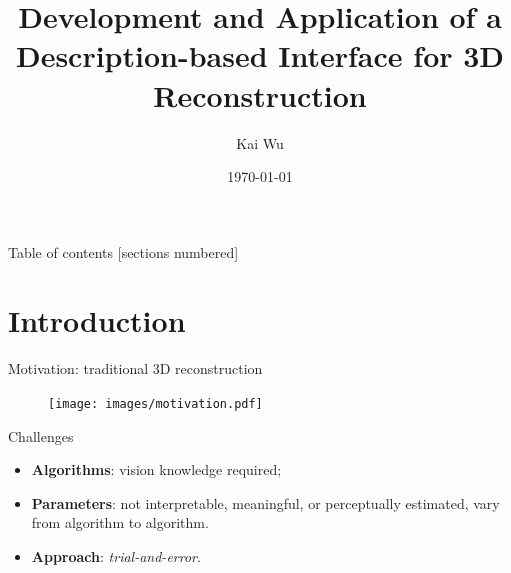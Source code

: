 \documentclass[10pt]{beamer}
\title[Interface of 3D Reconstruction]{Development and Application of a Description-based Interface for 3D Reconstruction} %
\author{Kai Wu}
\institute[UBC]
{
University of British Columbia \\ %
\medskip
kaywu@ece.ubc.ca \\ %
}
\date{\today}
\begin{document}
\begin{frame}
\maketitle
\end{frame}

\begin{frame}{Table of contents}
  [sections numbered]
  \tableofcontents[hideallsubsections]
\end{frame}


\section{Introduction}
{ %
    \begin{frame}[plain]
     \end{frame}
}


\begin{frame}{Motivation: traditional 3D reconstruction}

\begin{figure}
\centering
\texttt{[image: images/motivation.pdf]}
\end{figure}

\begin{alertblock}{Challenges}
  \begin{itemize}
    \item \textbf{Algorithms}: vision knowledge required;
    \item \textbf{Parameters}: not interpretable, meaningful, or perceptually estimated, vary from algorithm to algorithm.
    \item \textbf{Approach}: \textit{trial-and-error}.
  \end{itemize}
\end{alertblock}

\end{frame}
\end{document}
